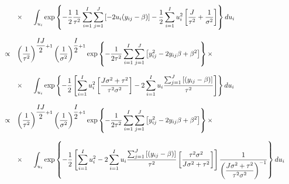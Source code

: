 \documentclass{article}
\begin{document}
\begin{equation*}
\begin{array}{lcl ll }
& & \times \hspace{0.5cm} \displaystyle\int_{u_i} \mbox{exp}\left\{ - \dfrac{1}{2}\dfrac{1}{\tau^2}\displaystyle\sum_{i=1}^{I}\sum_{j=1}^{J}\left[ -2u_i (y_{ij} - \beta)\right] - \dfrac{1}{2}\displaystyle\sum_{i=1}^{I}u_i^2 \left[ \dfrac{J}{\tau^2} + \dfrac{1}{\sigma^2} \right] \right\} du_i\\\\

& \propto & \left(\dfrac{1}{\tau^2}\right)^{\dfrac{IJ}{2}+1} \left(\dfrac{1}{\sigma^2}\right)^{\dfrac{I}{2}+1}  \mbox{exp}\left\{ - \dfrac{1}{2\tau^2} \displaystyle\sum_{i=1}^{I}\sum_{j=1}^{J}\left[ y_{ij}^2 - 2y_{ij}\beta + \beta^2 \right] \right\} \times \\ \\

& & \times \hspace{0.5cm} \displaystyle\int_{u_i} \mbox{exp}\left\{ - \dfrac{1}{2} \left[ \displaystyle\sum_{i=1}^{I}u_i^2 \left[ \dfrac{J\sigma^2 + \tau^2}{\tau^2\sigma^2} \right] - 2\displaystyle\sum_{i=1}^{I}u_i \dfrac{\sum_{j=1}^{J}\left[ (y_{ij} - \beta)\right]}{\tau^2} \right] \right\} du_i\\\\

& \propto & \left(\dfrac{1}{\tau^2}\right)^{\dfrac{IJ}{2}+1} \left(\dfrac{1}{\sigma^2}\right)^{\dfrac{I}{2}+1}  \mbox{exp}\left\{ - \dfrac{1}{2\tau^2} \displaystyle\sum_{i=1}^{I}\sum_{j=1}^{J}\left[ y_{ij}^2 - 2y_{ij}\beta + \beta^2 \right] \right\} \times \\ \\

& & \times \hspace{0.5cm} \displaystyle\int_{u_i} \mbox{exp}\left\{ - \dfrac{1}{2} \left[ \displaystyle\sum_{i=1}^{I}u_i^2 - 2\displaystyle\sum_{i=1}^{I}u_i \dfrac{\sum_{j=1}^{J}\left[ (y_{ij} - \beta)\right]}{\tau^2}\left[ \dfrac{\tau^2\sigma^2}{J\sigma^2 + \tau^2} \right] \right]\dfrac{1}{\left(\dfrac{J\sigma^2 + \tau^2}{\tau^2\sigma^2}\right)^{-1}} \right\} du_i\\\\

 \end{array}
\end{equation*}
\end{document}
